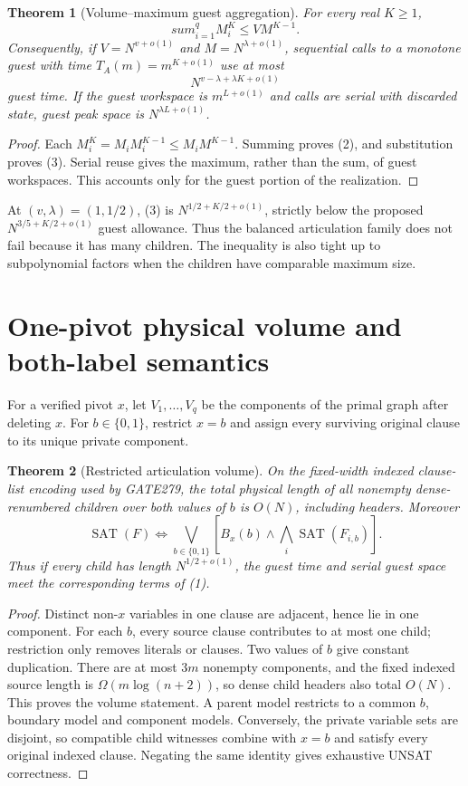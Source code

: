 \documentclass[11pt]{article}
\newtheorem{theorem}{Theorem}
\begin{document}
\begin{theorem}[Volume--maximum guest aggregation]
For every real $K\ge1$,
\[
 sum_{i=1}^q M_i^K\le V M^{K-1}.                  \tag{2}
\]
Consequently, if $V=N^{v+o(1)}$ and $M=N^{\lambda+o(1)}$, sequential calls to
a monotone guest with time $T_A(m)=m^{K+o(1)}$ use at most
\[
 N^{v-\lambda+\lambda K+o(1)}                     \tag{3}
\]
guest time.  If the guest workspace is $m^{L+o(1)}$ and calls are serial with
discarded state, guest peak space is $N^{\lambda L+o(1)}$.
\end{theorem}
\begin{proof}
Each $M_i^K=M_iM_i^{K-1}\le M_iM^{K-1}$.  Summing proves (2), and substitution
proves (3).  Serial reuse gives the maximum, rather than the sum, of guest
workspaces.  This accounts only for the guest portion of the realization.
\end{proof}

At $(v,\lambda)=(1,1/2)$, (3) is
$N^{1/2+K/2+o(1)}$, strictly below the proposed
$N^{3/5+K/2+o(1)}$ guest allowance.  Thus the balanced articulation family
does not fail because it has many children.  The inequality is also tight up
to subpolynomial factors when the children have comparable maximum size.

\section{One-pivot physical volume and both-label semantics}
For a verified pivot $x$, let $V_1,\ldots,V_q$ be the components of the primal
graph after deleting $x$.  For $b\in\{0,1\}$, restrict $x=b$ and assign every
surviving original clause to its unique private component.

\begin{theorem}[Restricted articulation volume]
On the fixed-width indexed clause-list encoding used by GATE279, the total
physical length of all nonempty dense-renumbered children over both values of
$b$ is $O(N)$, including headers.  Moreover
\[
 \operatorname{SAT}(F)\iff
 \bigvee_{b\in\{0,1\}}\left[B_x(b)\land
       \bigwedge_i\operatorname{SAT}(F_{i,b})\right].               \tag{4}
\]
Thus if every child has length $N^{1/2+o(1)}$, the guest time and serial guest
space meet the corresponding terms of (1).
\end{theorem}
\begin{proof}
Distinct non-$x$ variables in one clause are adjacent, hence lie in one
component.  For each $b$, every source clause contributes to at most one
child; restriction only removes literals or clauses.  Two values of $b$ give
constant duplication.  There are at most $3m$ nonempty components, and the
fixed indexed source length is $\Omega(m\log(n+2))$, so dense child headers
also total $O(N)$.  This proves the volume statement.  A parent model
restricts to a common $b$, boundary model and component models.  Conversely,
the private variable sets are disjoint, so compatible child witnesses combine
with $x=b$ and satisfy every original indexed clause.  Negating the same
identity gives exhaustive UNSAT correctness.
\end{proof}
\end{document}
